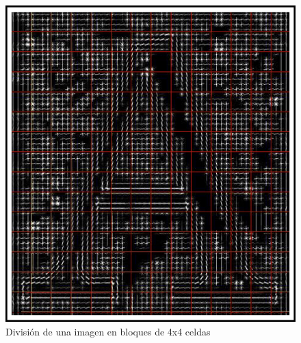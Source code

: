 		\begin{figure}[htbp]
			\centering
			\centerline{ \includegraphics[scale=0.7]{img/letter_A_with_cells.jpg} }
			\caption[División por bloques de una imagen]{División de una imagen en bloques de 4x4 celdas}
			\label{fig: Division por bloques en imagen}
		\end{figure}
		
